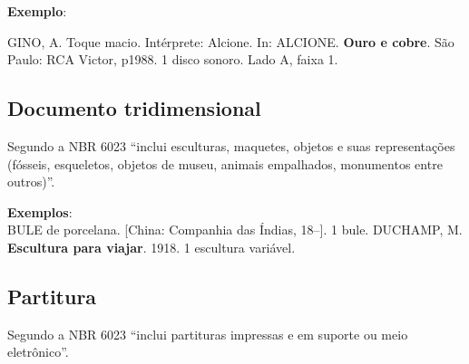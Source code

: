 \begin{exemplomanual}
\textbf{Exemplo}:\\
\begin{singlespace}
GINO, A. Toque macio. Intérprete: Alcione. In: ALCIONE. \textbf{Ouro e cobre}. São Paulo: RCA Victor, p1988. 1 disco sonoro. Lado A, faixa 1.
\end{singlespace}
\end{exemplomanual}


\subsection{Documento tridimensional}

Segundo a NBR 6023 \cite[p.14]{NBR6023:2002} ``inclui esculturas, maquetes, objetos e suas representações (fósseis, esqueletos, objetos de museu, animais empalhados, monumentos entre outros)''. 

\begin{flushleft}
\begin{singlespace}
\end{singlespace}
\end{flushleft}

\begin{exemplomanual}
\textbf{Exemplos}:\\
BULE de porcelana. [China: Companhia das Índias, 18--]. 1 bule.
\newline
\newline
DUCHAMP, M. \textbf{Escultura para viajar}. 1918. 1 escultura variável.
\end{exemplomanual}


\subsection{Partitura}

Segundo a NBR 6023 \cite[p.13]{NBR6023:2002} ``inclui partituras impressas e em suporte ou meio eletrônico''.

\begin{flushleft}
\begin{singlespace}
\end{singlespace}
\end{flushleft}

